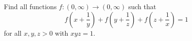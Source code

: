 Find all functions $f:(0,\infty) \rightarrow (0,\infty)$ such that \[f\left(x+\frac{1}{y}\right)+f\left(y+\frac{1}{z}\right) + f\left(z+\frac{1}{x}\right) = 1\]for all $x,y,z >0$ with $xyz =1$.